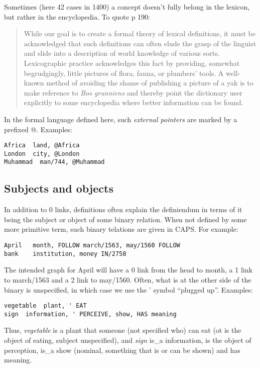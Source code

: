 \documentclass[11pt,bookmarks,bookmarksnumbered,naturalnames,plainpages=false,pdftex,colorlinks=true,urlcolor=blue,bookmarksdepth=subsection,plainpages=false]{paper}
\begin{document}
Sometimes (here 42 cases in 1400) a concept doesn't fully belong in the
lexicon, but rather in the encyclopedia. To quote \cite{Kornai:2019} p 190:

\begin{quotation} 
While our goal is to create a formal theory of lexical definitions, it must be
acknowledged that such definitions can often elude the grasp of the linguist
and slide into a description of world knowledge of various sorts.
Lexicographic practice acknowledges this fact by providing, somewhat
begrudgingly, little pictures of flora, fauna, or plumbers’ tools. A
well-known method of avoiding the shame of publishing a picture of a yak is to
make reference to {\it Bos grunniens} and thereby point the dictionary user
explicitly to some encyclopedia where better information can be found.
\end{quotation}

In the formal language defined here, such {\it external pointers} are marked
by a prefixed @. Examples:

\begin{verbatim}
Africa	land, @Africa	
London	city, @London	
Muhammad  man/744, @Muhammad	
\end{verbatim}

\subsection{Subjects and objects}

In addition to 0 links, definitions often explain the definiendum in terms of
it being the subject or object of some binary relation. When not defined by
some more primitive term, such binary telations are given in CAPS.  For
example:

\begin{verbatim}
April   month, FOLLOW march/1563, may/1560 FOLLOW
bank    institution, money IN/2758
\end{verbatim}

\noindent
The intended graph for April will have a 0 link from the head to month, a 1
link to march/1563 and a 2 link to may/1560. Often, what is at the other side
of the binary is unspecified, in which case we use the ' symbol ``plugged
up''.  Examples:

\begin{verbatim}
vegetable  plant, ' EAT
sign  information, ' PERCEIVE, show, HAS meaning
\end{verbatim}

\noindent
Thus, {\it vegetable} is a plant that someone (not specified who) can eat (ot
is the object of eating, subject unspecified), and {\it sign} is\_a
information, is the object of perception, is\_a show (nominal, something that
is or can be shown) and has meaning.
\end{document}
